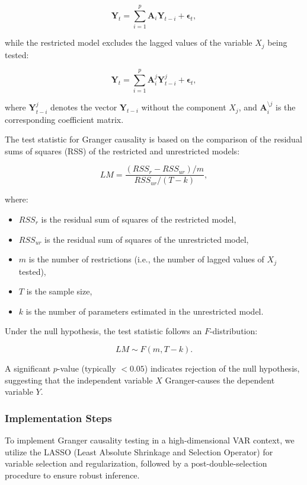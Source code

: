 \documentclass[12pt]{article}
\begin{document}
\[
\mathbf{Y}_t = \sum_{i=1}^{p} \mathbf{A}_i \mathbf{Y}_{t-i} + \boldsymbol{\epsilon}_t,
\]

while the restricted model excludes the lagged values of the variable \(X_j\) being tested:

\[
\mathbf{Y}_t = \sum_{i=1}^{p} \mathbf{A}_i^{j} \mathbf{Y}_{t-i}^{j} + \boldsymbol{\epsilon}_t,
\]

where \(\mathbf{Y}_{t-i}^{j}\) denotes the vector \(\mathbf{Y}_{t-i}\) without the component \(X_j\), and \(\mathbf{A}_i^{\setminus j}\) is the corresponding coefficient matrix.

The test statistic for Granger causality is based on the comparison of the residual sums of squares (RSS) of the restricted and unrestricted models:

\[
LM = \frac{(RSS_r - RSS_{ur}) / m}{RSS_{ur} / (T - k)},
\]

where:
\begin{itemize}
    \item \(RSS_r\) is the residual sum of squares of the restricted model,
    \item \(RSS_{ur}\) is the residual sum of squares of the unrestricted model,
    \item \(m\) is the number of restrictions (i.e., the number of lagged values of \(X_j\) tested),
    \item \(T\) is the sample size,
    \item \(k\) is the number of parameters estimated in the unrestricted model.
\end{itemize}

Under the null hypothesis, the test statistic follows an \(F\)-distribution:

\[
LM \sim F(m, T - k).
\]

A significant \(p\)-value (typically \(< 0.05\)) indicates rejection of the null hypothesis, suggesting that the independent variable \(X\) Granger-causes the dependent variable \(Y\).

\subsubsection{Implementation Steps}

To implement Granger causality testing in a high-dimensional VAR context, we utilize the LASSO (Least Absolute Shrinkage and Selection Operator) for variable selection and regularization, followed by a post-double-selection procedure to ensure robust inference.
\end{document}
